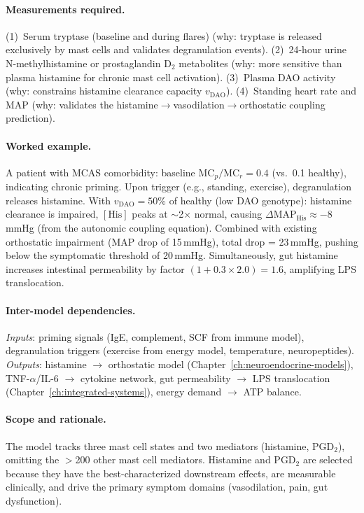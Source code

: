 \paragraph{Measurements required.}
(1)~Serum tryptase (baseline and during flares) (why: tryptase is released exclusively by mast cells and validates degranulation events).
(2)~24-hour urine N-methylhistamine or prostaglandin D$_2$ metabolites (why: more sensitive than plasma histamine for chronic mast cell activation).
(3)~Plasma DAO activity (why: constrains histamine clearance capacity $v_{\text{DAO}}$).
(4)~Standing heart rate and MAP (why: validates the histamine$\to$vasodilation$\to$orthostatic coupling prediction).

\paragraph{Worked example.}
A patient with MCAS comorbidity: baseline $\text{MC}_p/\text{MC}_r = 0.4$ (vs.\ 0.1 healthy), indicating chronic priming. Upon trigger (e.g., standing, exercise), degranulation releases histamine. With $v_{\text{DAO}} = 50\%$ of healthy (low DAO genotype): histamine clearance is impaired, $[\text{His}]$ peaks at $\sim$2$\times$ normal, causing $\Delta\text{MAP}_{\text{His}} \approx -8$\,mmHg (from the autonomic coupling equation). Combined with existing orthostatic impairment (MAP drop of 15\,mmHg), total drop = 23\,mmHg, pushing below the symptomatic threshold of 20\,mmHg. Simultaneously, gut histamine increases intestinal permeability by factor $(1 + 0.3 \times 2.0) = 1.6$, amplifying LPS translocation.

\paragraph{Inter-model dependencies.}
\emph{Inputs}: priming signals (IgE, complement, SCF from immune model), degranulation triggers (exercise from energy model, temperature, neuropeptides). \emph{Outputs}: histamine $\to$ orthostatic model (Chapter~\ref{ch:neuroendocrine-models}), TNF-$\alpha$/IL-6 $\to$ cytokine network, gut permeability $\to$ LPS translocation (Chapter~\ref{ch:integrated-systems}), energy demand $\to$ ATP balance.

\paragraph{Scope and rationale.}
The model tracks three mast cell states and two mediators (histamine, PGD$_2$), omitting the $>$200 other mast cell mediators. Histamine and PGD$_2$ are selected because they have the best-characterized downstream effects, are measurable clinically, and drive the primary symptom domains (vasodilation, pain, gut dysfunction).

